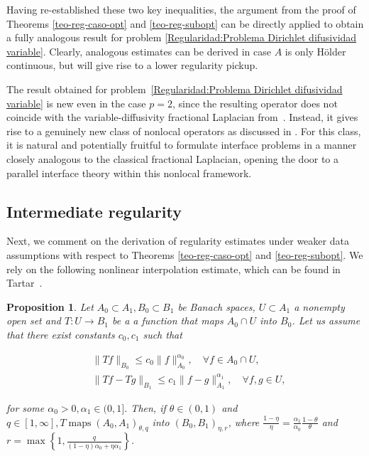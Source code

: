\documentclass[]{amsart}
\newtheorem{proposition}[theorem]{Proposition}
\theoremstyle{definition}
\theoremstyle{definition}
\theoremstyle{remark}
\numberwithin{equation}{section}
\begin{document}
		Having re-established these two key inequalities, the argument from the proof of Theorems \ref{teo-reg-caso-opt} and \ref{teo-reg-subopt} can be directly applied to obtain a fully analogous result for problem \eqref{Regularidad:Problema Dirichlet difusividad variable}. Clearly, analogous estimates can be derived in case $A$ is only H\"older continuous, but will give rise to a lower regularity pickup.
		
The result obtained for problem~\eqref{Regularidad:Problema Dirichlet difusividad variable} is new even in the case \(p=2\), since the resulting operator does not coincide with the variable-diffusivity fractional Laplacian from~\cite{borthagaray2023besov}. Instead, it gives rise to a genuinely new class of nonlocal operators as discussed in \cite{shieh2015new,garcia2025fractional}. For this class, it is natural and potentially fruitful to formulate interface problems in a manner closely analogous to the classical fractional Laplacian, opening the door to a parallel interface theory within this nonlocal framework.

\subsection{Intermediate regularity}
Next, we comment on the derivation of regularity estimates under weaker data assumptions with respect to Theorems \ref{teo-reg-caso-opt} and \ref{teo-reg-subopt}.
We rely on the following nonlinear interpolation estimate, which can be found in Tartar~\cite[Theorem~I.1]{TARTAR1972469}.

	\begin{proposition}
\label{prop-nonlinearinterplation} Let $A_0 \subset A_1, B_0 \subset B_1$ be Banach spaces, $U \subset A_1$ a nonempty open set and $T: U \rightarrow B_1$ be a a function that maps $A_0 \cap U$ into $B_0$. Let us assume that there exist constants $c_0, c_1$ such that
	
	$$
	\begin{aligned}
		& \|T f\|_{B_0} \leq c_0\|f\|_{A_0}^{\alpha_0}, \quad \forall f \in A_0 \cap U, \\
		& \|T f-T g\|_{B_1} \leq c_1\|f-g\|_{A_1}^{\alpha_1}, \quad \forall f, g \in U,
	\end{aligned}
	$$
	
	\noindent for some $\alpha_0>0, \alpha_1 \in(0,1]$. Then, if $\theta \in(0,1)$ and $q \in[1, \infty], T \operatorname{maps}\left(A_0, A_1\right)_{\theta, q}$ into $\left(B_0, B_1\right)_{\eta, r}$, where $\frac{1-\eta}{\eta}=\frac{\alpha_1}{\alpha_0} \frac{1-\theta}{\theta}$ and $r=\max \left\{1, \frac{q}{(1-\eta) \alpha_0+\eta \alpha_1}\right\}$.
	\end{proposition}
	
\end{document}
